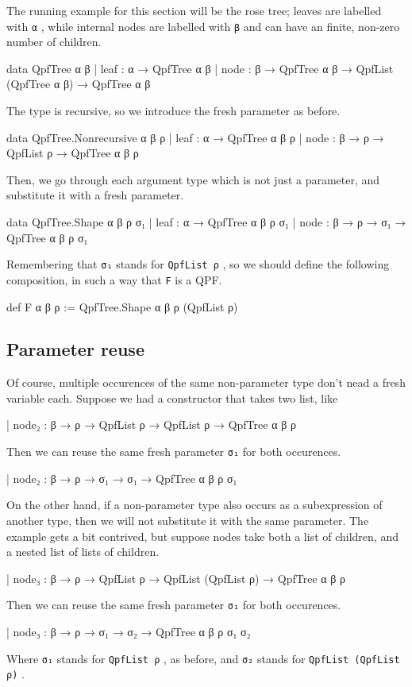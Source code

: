 \documentclass[titlepage]{report}
\newcommand\lean[1]{{%
\def\leanmode{1}%
\small \texttt{#1}%
\undef\leanmode%
}}
\begin{document}
The running example for this section will be the rose tree; leaves are labelled with \lean{α}, while
internal nodes are labelled with \lean{β} and can have an finite, non-zero number of children.
\begin{leancode}
    data QpfTree α β
      | leaf : α → QpfTree α β
      | node : β → QpfTree α β → QpfList (QpfTree α β) → QpfTree α β
\end{leancode}

The type is recursive, so we introduce the fresh parameter as before.
\begin{leancode}
    data QpfTree.Nonrecursive α β ρ
      | leaf : α → QpfTree α β ρ
      | node : β → ρ → QpfList ρ → QpfTree α β ρ
\end{leancode}

Then, we go through each argument type which is not just a parameter, and substitute
it with a fresh parameter.

\begin{leancode}
    data QpfTree.Shape α β ρ σ₁
      | leaf : α → QpfTree α β ρ σ₁
      | node : β → ρ → σ₁ → QpfTree α β ρ σ₁
\end{leancode}
Remembering that \lean{σ₁} stands for \lean{QpfList ρ}, so we should define the following 
composition, in such a way that \lean{F} is a QPF.
\begin{leancode}
    def F α β ρ := QpfTree.Shape α β ρ (QpfList ρ)
\end{leancode}


\subsection{Parameter reuse}
Of course, multiple occurences of the same non-parameter type don't nead a fresh variable each.
Suppose we had a constructor that takes two list, like
\begin{leancode}
    | node₂ : β → ρ → QpfList ρ → QpfList ρ → QpfTree α β ρ
\end{leancode}
Then we can reuse the same fresh parameter \lean{σ₁} for both occurences.
\begin{leancode}
    | node₂ : β → ρ → σ₁ → σ₁ → QpfTree α β ρ σ₁
\end{leancode}

On the other hand, if a non-parameter type also occurs as a subexpression of another type, then
we will not substitute it with the same parameter.
The example gets a bit contrived, but suppose nodes take both a list of children, and a nested list 
of lists of children.
\begin{leancode}
    | node₃ : β → ρ → QpfList ρ → QpfList (QpfList ρ) → QpfTree α β ρ
\end{leancode}
Then we can reuse the same fresh parameter \lean{σ₁} for both occurences.
\begin{leancode}
    | node₃ : β → ρ → σ₁ → σ₂ → QpfTree α β ρ σ₁ σ₂
\end{leancode}
Where \lean{σ₁} stands for \lean{QpfList ρ}, as before, and \lean{σ₂} stands for 
\lean{QpfList (QpfList ρ)}.
\end{document}
